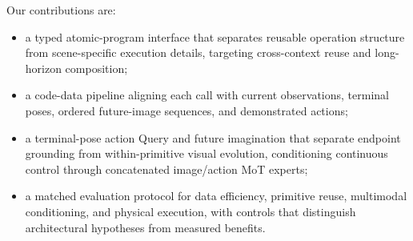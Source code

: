Our contributions are:
\begin{itemize}
\item a typed atomic-program interface that separates reusable operation structure from scene-specific execution details, targeting cross-context reuse and long-horizon composition;
\item a code-data pipeline aligning each call with current observations, terminal poses, ordered future-image sequences, and demonstrated actions;
\item a terminal-pose action Query and future imagination that separate endpoint grounding from within-primitive visual evolution, conditioning continuous control through concatenated image/action MoT experts;
\item a matched evaluation protocol for data efficiency, primitive reuse, multimodal conditioning, and physical execution, with controls that distinguish architectural hypotheses from measured benefits.
\end{itemize}